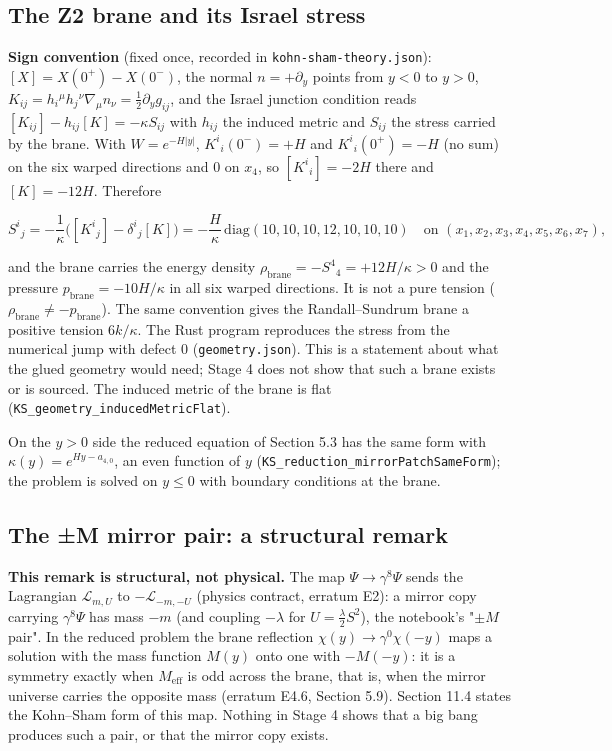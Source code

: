 \documentclass[11pt]{article}
\begin{document}
\subsection{The Z2 brane and its Israel stress}

\textbf{Sign convention} (fixed once, recorded in \texttt{kohn-sha\allowbreak{}m-theory\allowbreak{}.json}): $[X]=X(0^+)-X(0^-)$, the normal $n=+\partial_y$ points from $y<0$ to $y>0$, $K_{ij}=h_i{}^\mu h_j{}^\nu\nabla_\mu n_\nu=\tfrac12\partial_yg_{ij}$, and the Israel junction condition reads $[K_{ij}]-h_{ij}[K]=-\kappa S_{ij}$ with $h_{ij}$ the induced metric and $S_{ij}$ the stress carried by the brane. With $W=e^{-H|y|}$, $K^i{}_i(0^-)=+H$ and $K^i{}_i(0^+)=-H$ (no sum) on the six warped directions and $0$ on $x_4$, so $[K^i{}_i]=-2H$ there and $[K]=-12H$. Therefore

\[
S^i{}_j=-\frac1\kappa\bigl([K^i{}_j]-\delta^i{}_j[K]\bigr)=-\frac{H}{\kappa}\,\mathrm{diag}(10,10,10,12,10,10,10)\quad\text{on }(x_1,x_2,x_3,x_4,x_5,x_6,x_7),
\]

and the brane carries the energy density $\rho_{\mathrm{brane}}=-S^4{}_4=+12H/\kappa>0$ and the pressure $p_{\mathrm{brane}}=-10H/\kappa$ in all six warped directions. It is not a pure tension ($\rho_{\mathrm{brane}}\ne-p_{\mathrm{brane}}$). The same convention gives the Randall--Sundrum brane a positive tension $6k/\kappa$. The Rust program reproduces the stress from the numerical jump with defect $0$ (\texttt{geometry\allowbreak{}.json}). This is a statement about what the glued geometry would need; Stage 4 does not show that such a brane exists or is sourced. The induced metric of the brane is flat (\texttt{KS\_geome\allowbreak{}try\_indu\allowbreak{}cedMetri\allowbreak{}cFlat}).

On the $y>0$ side the reduced equation of Section 5.3 has the same form with $\kappa(y)=e^{Hy-a_{4,0}}$, an even function of $y$ (\texttt{KS\_reduc\allowbreak{}tion\_mir\allowbreak{}rorPatch\allowbreak{}SameForm}); the problem is solved on $y\le0$ with boundary conditions at the brane.

\subsection{The ±M mirror pair: a structural remark}

\textbf{This remark is structural, not physical.} The map $\Psi\to\gamma^8\Psi$ sends the Lagrangian $\mathcal L_{m,U}$ to $-\mathcal L_{-m,-U}$ (physics contract, erratum E2): a mirror copy carrying $\gamma^8\Psi$ has mass $-m$ (and coupling $-\lambda$ for $U=\tfrac\lambda2S^2$), the notebook's "$\pm M$ pair". In the reduced problem the brane reflection $\chi(y)\to\gamma^0\chi(-y)$ maps a solution with the mass function $M(y)$ onto one with $-M(-y)$: it is a symmetry exactly when $M_{\mathrm{eff}}$ is odd across the brane, that is, when the mirror universe carries the opposite mass (erratum E4.6, Section 5.9). Section 11.4 states the Kohn--Sham form of this map. Nothing in Stage 4 shows that a big bang produces such a pair, or that the mirror copy exists.
\end{document}
